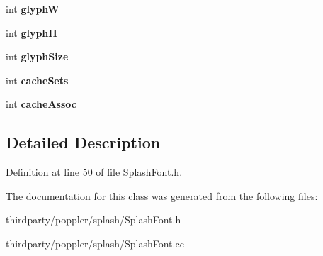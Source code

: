 \begin{DoxyCompactItemize}
int {\bfseries glyphW}
\item 
\mbox{\label{class_splash_font_a2f5dce72836a9bc473003825620b4332}} 
int {\bfseries glyphH}
\item 
\mbox{\label{class_splash_font_a5ff36794db98fb926e586fd664d21b05}} 
int {\bfseries glyph\+Size}
\item 
\mbox{\label{class_splash_font_a738471badb7518ead7217cf54b8d1f05}} 
int {\bfseries cache\+Sets}
\item 
\mbox{\label{class_splash_font_a054f818e26daefa2b18a2e8ca1abfa11}} 
int {\bfseries cache\+Assoc}
\end{DoxyCompactItemize}


\subsection{Detailed Description}


Definition at line 50 of file Splash\+Font.\+h.



The documentation for this class was generated from the following files\+:\begin{DoxyCompactItemize}
\item 
thirdparty/poppler/splash/Splash\+Font.\+h\item 
thirdparty/poppler/splash/Splash\+Font.\+cc\end{DoxyCompactItemize}
